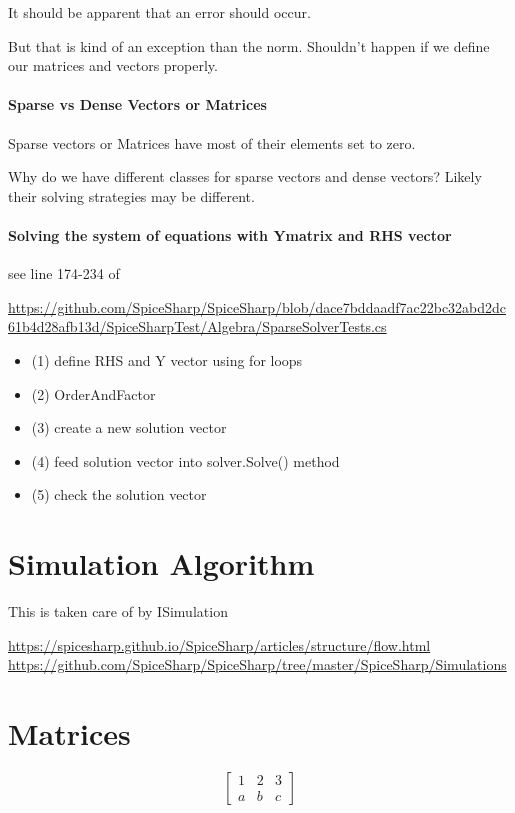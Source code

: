 \documentclass[12pt]{article}
\renewcommand{\_}{\kern-1.5pt\textunderscore\kern-1.5pt}
\begin{document}
It should be apparent that an error should occur.

But that is kind of an exception than the norm. Shouldn't happen if we define our matrices and vectors properly.

\subsection{Sparse vs Dense Vectors or Matrices}

Sparse vectors or Matrices have most of their elements set to zero.

Why do we have different classes for sparse vectors and dense vectors? Likely their solving strategies may be different.

\subsection{Solving the system of equations with Ymatrix and RHS vector}

see line 174-234 of


\url{https://github.com/SpiceSharp/SpiceSharp/blob/dace7bddaadf7ac22bc32abd2dc61b4d28afb13d/SpiceSharpTest/Algebra/SparseSolverTests.cs}

\begin{itemize}
\item (1) define RHS and Y vector using for loops
\item (2) OrderAndFactor
\item (3) create a new solution vector
\item (4) feed solution vector into solver.Solve() method
\item (5) check the solution vector
\end{itemize}


\part{Simulation Algorithm}

This is taken care of by ISimulation

\url{https://spicesharp.github.io/SpiceSharp/articles/structure/flow.html}
\url{https://github.com/SpiceSharp/SpiceSharp/tree/master/SpiceSharp/Simulations}


\part{Matrices}

$$\begin{bmatrix}
1 & 2 & 3 \\
a & b & c
\end{bmatrix}$$

 
\end{document}
